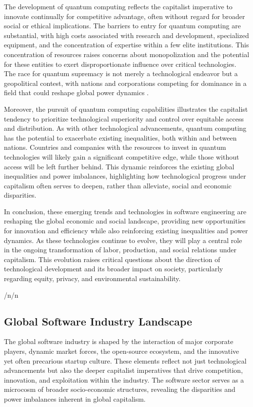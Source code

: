 \begin{refsection}
The development of quantum computing reflects the capitalist imperative to innovate continually for competitive advantage, often without regard for broader social or ethical implications. The barriers to entry for quantum computing are substantial, with high costs associated with research and development, specialized equipment, and the concentration of expertise within a few elite institutions. This concentration of resources raises concerns about monopolization and the potential for these entities to exert disproportionate influence over critical technologies. The race for quantum supremacy is not merely a technological endeavor but a geopolitical contest, with nations and corporations competing for dominance in a field that could reshape global power dynamics \cite[pp.~150-152]{preskill2018quantum}.

Moreover, the pursuit of quantum computing capabilities illustrates the capitalist tendency to prioritize technological superiority and control over equitable access and distribution. As with other technological advancements, quantum computing has the potential to exacerbate existing inequalities, both within and between nations. Countries and companies with the resources to invest in quantum technologies will likely gain a significant competitive edge, while those without access will be left further behind. This dynamic reinforces the existing global inequalities and power imbalances, highlighting how technological progress under capitalism often serves to deepen, rather than alleviate, social and economic disparities.

In conclusion, these emerging trends and technologies in software engineering are reshaping the global economic and social landscape, providing new opportunities for innovation and efficiency while also reinforcing existing inequalities and power dynamics. As these technologies continue to evolve, they will play a central role in the ongoing transformation of labor, production, and social relations under capitalism. This evolution raises critical questions about the direction of technological development and its broader impact on society, particularly regarding equity, privacy, and environmental sustainability.

/n/n\subsection{Global Software Industry Landscape}

The global software industry is shaped by the interaction of major corporate players, dynamic market forces, the open-source ecosystem, and the innovative yet often precarious startup culture. These elements reflect not just technological advancements but also the deeper capitalist imperatives that drive competition, innovation, and exploitation within the industry. The software sector serves as a microcosm of broader socio-economic structures, revealing the disparities and power imbalances inherent in global capitalism.


\end{refsection}
